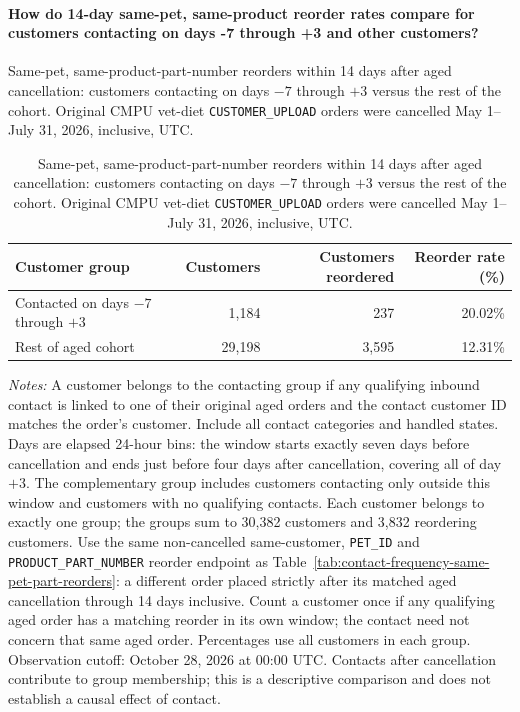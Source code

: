 \paragraph{How do 14-day same-pet, same-product reorder rates compare for customers contacting on days -7 through +3 and other customers?}
Same-pet, same-product-part-number reorders within 14 days after aged cancellation: customers contacting on days $-7$ through $+3$ versus the rest of the cohort. Original CMPU vet-diet \texttt{CUSTOMER\_UPLOAD} orders were cancelled May 1--July 31, 2026, inclusive, UTC.

\begin{table}[!htbp]
\centering
\caption{Same-pet, same-product-part-number reorders within 14 days after aged cancellation: customers contacting on days $-7$ through $+3$ versus the rest of the cohort. Original CMPU vet-diet \texttt{CUSTOMER\_UPLOAD} orders were cancelled May 1--July 31, 2026, inclusive, UTC.}
\label{tab:contact-window-same-pet-part-reorders}
\begin{tabular}{@{}lrrr@{}}
\toprule
Customer group & Customers & Customers reordered & Reorder rate (\%) \\
\midrule

Contacted on days $-7$ through $+3$ & 1,184 & 237 & 20.02\% \\

Rest of aged cohort & 29,198 & 3,595 & 12.31\% \\
\bottomrule
\end{tabular}

\begin{minipage}{\linewidth}
\footnotesize
\textit{Notes:} A customer belongs to the contacting group if any qualifying
inbound contact is linked to one of their original aged orders and the contact
customer ID matches the order's customer. Include all contact categories and
handled states. Days are elapsed 24-hour bins: the window starts exactly seven
days before cancellation and ends just before four days after cancellation,
covering all of day $+3$. The complementary group includes customers contacting
only outside this window and customers with no qualifying contacts. Each
customer belongs to exactly one group; the groups sum to 30,382 customers and
3,832 reordering customers. Use the same non-cancelled same-customer,
\texttt{PET\_ID} and \texttt{PRODUCT\_PART\_NUMBER} reorder endpoint as
Table~\ref{tab:contact-frequency-same-pet-part-reorders}: a different order
placed strictly after its matched aged cancellation through 14 days inclusive.
Count a customer once if any qualifying aged order has a matching reorder in
its own window; the contact need not concern that same aged order. Percentages
use all customers in each group. Observation cutoff: October 28, 2026 at 00:00
UTC. Contacts after cancellation contribute to group membership; this is a
descriptive comparison and does not establish a causal effect of contact.
\end{minipage}
\end{table}
